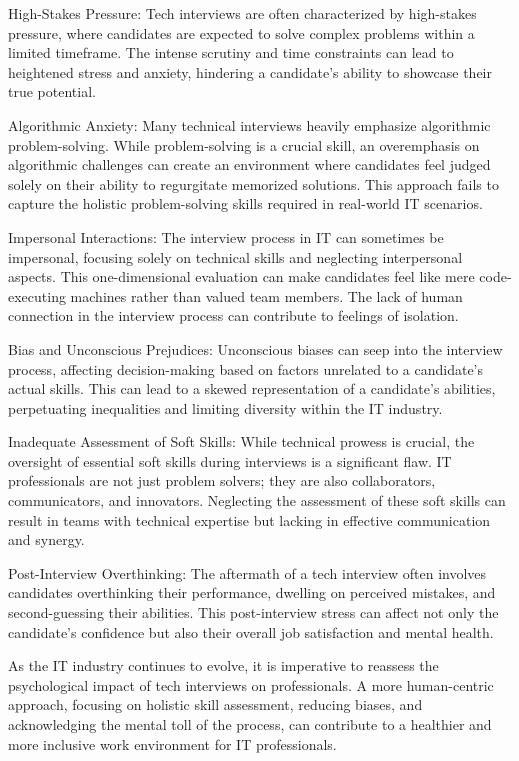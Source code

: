 \documentclass[
    a4paper, %
    10pt, %
    unnumberedsections, %
    twoside, %
]{LTJournalArticle}
\begin{document}
High-Stakes Pressure:
Tech interviews are often characterized by high-stakes pressure, where candidates are expected to solve complex problems within a limited timeframe. The intense scrutiny and time constraints can lead to heightened stress and anxiety, hindering a candidate's ability to showcase their true potential.

Algorithmic Anxiety:
Many technical interviews heavily emphasize algorithmic problem-solving. While problem-solving is a crucial skill, an overemphasis on algorithmic challenges can create an environment where candidates feel judged solely on their ability to regurgitate memorized solutions. This approach fails to capture the holistic problem-solving skills required in real-world IT scenarios.

Impersonal Interactions:
The interview process in IT can sometimes be impersonal, focusing solely on technical skills and neglecting interpersonal aspects. This one-dimensional evaluation can make candidates feel like mere code-executing machines rather than valued team members. The lack of human connection in the interview process can contribute to feelings of isolation.

Bias and Unconscious Prejudices:
Unconscious biases can seep into the interview process, affecting decision-making based on factors unrelated to a candidate's actual skills. This can lead to a skewed representation of a candidate's abilities, perpetuating inequalities and limiting diversity within the IT industry.

Inadequate Assessment of Soft Skills:
While technical prowess is crucial, the oversight of essential soft skills during interviews is a significant flaw. IT professionals are not just problem solvers; they are also collaborators, communicators, and innovators. Neglecting the assessment of these soft skills can result in teams with technical expertise but lacking in effective communication and synergy.

Post-Interview Overthinking:
The aftermath of a tech interview often involves candidates overthinking their performance, dwelling on perceived mistakes, and second-guessing their abilities. This post-interview stress can affect not only the candidate's confidence but also their overall job satisfaction and mental health.

As the IT industry continues to evolve, it is imperative to reassess the psychological impact of tech interviews on professionals. A more human-centric approach, focusing on holistic skill assessment, reducing biases, and acknowledging the mental toll of the process, can contribute to a healthier and more inclusive work environment for IT professionals.
\end{document}
